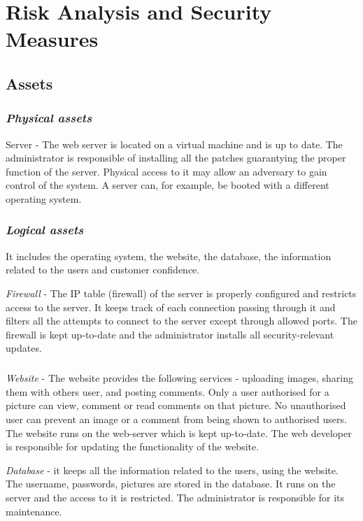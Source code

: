 \section{Risk Analysis and Security Measures}

\subsection{Assets}

\subsubsection{{\it Physical assets}}
Server - The web server is located on a virtual machine and is up to date. The administrator is responsible of installing all the patches guarantying the proper function of the server. 
Physical access to it may allow an adversary to gain control of the system. A server can,
for example, be booted with a different operating system.

\subsubsection{{\it Logical assets}}
It includes the operating system, the website, the database, the information related to the users and customer confidence. 

\textit{Firewall} - The IP table (firewall) of the server is properly configured and restricts access to the server. It keeps track of each connection passing through it and filters all the attempts to connect to the server except through allowed ports. The firewall is kept up-to-date and the administrator installs all security-relevant updates.


\subparagraph{} \textit{Website} - The website provides the following services - uploading images, sharing them with others user, and posting comments. Only a user authorised for a picture can view, comment or read comments on that picture. No unauthorised user can prevent an image or a comment from being shown to authorised users. The website runs on the web-server which is kept up-to-date. The web developer is responsible for updating the functionality of the website. 

\textit{Database} - it keeps all the information related to the users, using the website. The username, passwords, pictures are stored in the database. It runs on the server and the access to it is restricted. The administrator is responsible for its maintenance.

